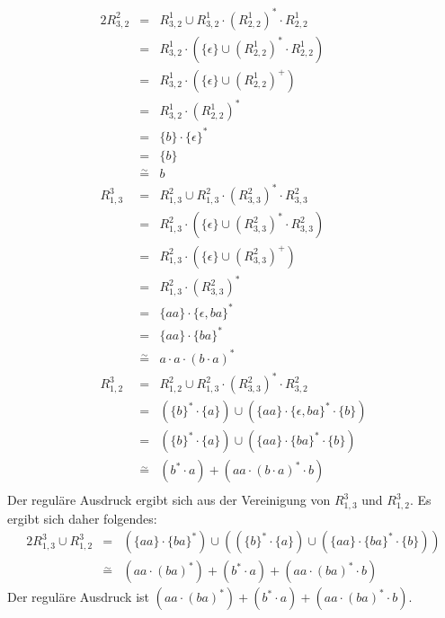 \documentclass[10pt,a4paper,oneside,ngerman,numbers=noenddot]{scrartcl}
\begin{document}
\begin{alignat*}{2}
R_{3,2}^{2} &=& R_{3,2}^{1} \cup R_{3,2}^{1} \cdot (R_{2,2}^{1})^{*} \cdot R_{2,2}^{1} \\
&=& R_{3,2}^{1} \cdot (\{\epsilon \} \cup (R_{2,2}^{1})^{*} \cdot R_{2,2}^{1}) \\
&=& R_{3,2}^{1} \cdot (\{\epsilon \} \cup (R_{2,2}^{1})^{+}) \\
&=& R_{3,2}^{1} \cdot (R_{2,2}^{1})^{*} \\
&=& \{b\} \cdot \{\epsilon \}^{*} \\
&=& \{b\} \\
&\overset{\sim}{=}& b \\
%
R_{1,3}^{3} &=& R_{1,3}^{2} \cup R_{1,3}^{2} \cdot (R_{3,3}^{2})^{*} \cdot R_{3,3}^{2} \\
&=& R_{1,3}^{2} \cdot (\{\epsilon \} \cup (R_{3,3}^{2})^{*} \cdot R_{3,3}^{2}) \\
&=& R_{1,3}^{2} \cdot (\{\epsilon \} \cup (R_{3,3}^{2})^{+}) \\
&=& R_{1,3}^{2} \cdot (R_{3,3}^{2})^{*} \\
&=& \{aa\} \cdot \{\epsilon , ba\}^{*} \\
&=& \{aa\} \cdot \{ba\}^{*} \\
&\overset{\sim}{=}& a \cdot a \cdot (b \cdot a)^{*} \\
%
R_{1,2}^{3} &=& R_{1,2}^{2} \cup R_{1,3}^{2} \cdot (R_{3,3}^{2})^{*} \cdot R_{3,2}^{2} \\
&=& (\{b\}^{*} \cdot \{a\}) \cup (\{aa\} \cdot \{\epsilon , ba\}^{*} \cdot \{b\}) \\
&=& (\{b\}^{*} \cdot \{a\}) \cup (\{aa\} \cdot \{ba\}^{*} \cdot \{b\}) \\
&\overset{\sim}{=}& (b^{*} \cdot a) + (aa \cdot (b \cdot a)^{*} \cdot b) \\
\end{alignat*}
Der reguläre Ausdruck ergibt sich aus der Vereinigung von $R_{1,3}^{3}$ und $R_{1,2}^{3}$. Es ergibt sich daher folgendes:\\
\begin{alignat*}{2}
R_{1,3}^{3} \cup R_{1,2}^{3} &=& (\{aa\} \cdot \{ba\}^{*}) \cup ((\{b\}^{*} \cdot \{a\}) \cup (\{aa\} \cdot \{ba\}^{*} \cdot \{b\})) \\
&\overset{\sim}{=}& (aa \cdot (ba)^{*}) + (b^{*} \cdot a) + (aa \cdot (ba)^{*} \cdot b)
\end{alignat*}
Der reguläre Ausdruck ist $(aa \cdot (ba)^{*}) + (b^{*} \cdot a) + (aa \cdot (ba)^{*} \cdot b)$.
\section{} %
\subsection{} %
\subsection{} %
\end{document}
